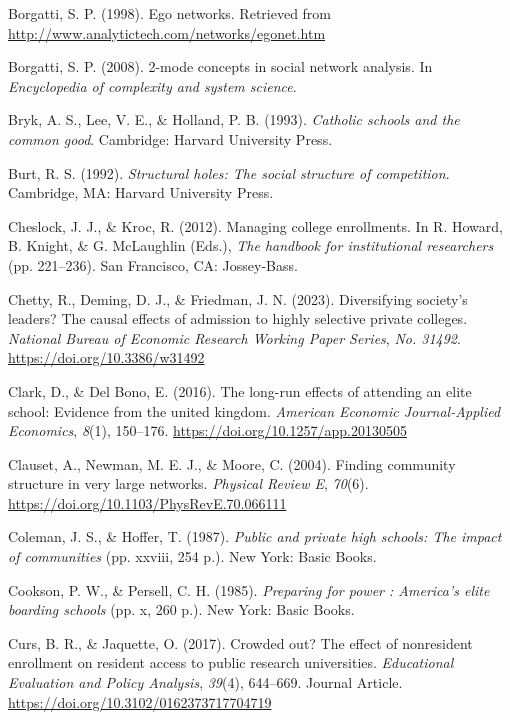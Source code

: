 \documentclass[
  12pt,
]{article}
\newlength{\cslhangindent}
\newenvironment{CSLReferences}[2] %
 {\begin{list}{}{%
  \setlength{\itemindent}{0pt}
  \setlength{\leftmargin}{0pt}
  \setlength{\parsep}{0pt}
  \ifodd #1
   \setlength{\leftmargin}{\cslhangindent}
   \setlength{\itemindent}{-1\cslhangindent}
  \fi
  \setlength{\itemsep}{#2\baselineskip}}}
 {\end{list}}
\begin{document}
\label{refs}
\begin{CSLReferences}{1}{0}
Borgatti, S. P. (1998). Ego networks. Retrieved from \url{http://www.analytictech.com/networks/egonet.htm}

Borgatti, S. P. (2008). 2-mode concepts in social network analysis. In \emph{Encyclopedia of complexity and system science}.

Bryk, A. S., Lee, V. E., \& Holland, P. B. (1993). \emph{Catholic schools and the common good}. Cambridge: Harvard University Press.

Burt, R. S. (1992). \emph{Structural holes: The social structure of competition}. Cambridge, MA: Harvard University Press.

Cheslock, J. J., \& Kroc, R. (2012). Managing college enrollments. In R. Howard, B. Knight, \& G. McLaughlin (Eds.), \emph{The handbook for institutional researchers} (pp. 221--236). San Francisco, CA: Jossey-Bass.

Chetty, R., Deming, D. J., \& Friedman, J. N. (2023). Diversifying society's leaders? The causal effects of admission to highly selective private colleges. \emph{National Bureau of Economic Research Working Paper Series}, \emph{No. 31492}. \url{https://doi.org/10.3386/w31492}

Clark, D., \& Del Bono, E. (2016). The long-run effects of attending an elite school: Evidence from the united kingdom. \emph{American Economic Journal-Applied Economics}, \emph{8}(1), 150--176. \url{https://doi.org/10.1257/app.20130505}

Clauset, A., Newman, M. E. J., \& Moore, C. (2004). Finding community structure in very large networks. \emph{Physical Review E}, \emph{70}(6). \url{https://doi.org/10.1103/PhysRevE.70.066111}

Coleman, J. S., \& Hoffer, T. (1987). \emph{Public and private high schools: The impact of communities} (pp. xxviii, 254 p.). New York: Basic Books.

Cookson, P. W., \& Persell, C. H. (1985). \emph{Preparing for power : America's elite boarding schools} (pp. x, 260 p.). New York: Basic Books.

Curs, B. R., \& Jaquette, O. (2017). Crowded out? The effect of nonresident enrollment on resident access to public research universities. \emph{Educational Evaluation and Policy Analysis}, \emph{39}(4), 644--669. Journal Article. \url{https://doi.org/10.3102/0162373717704719}


\end{CSLReferences}
\end{document}
